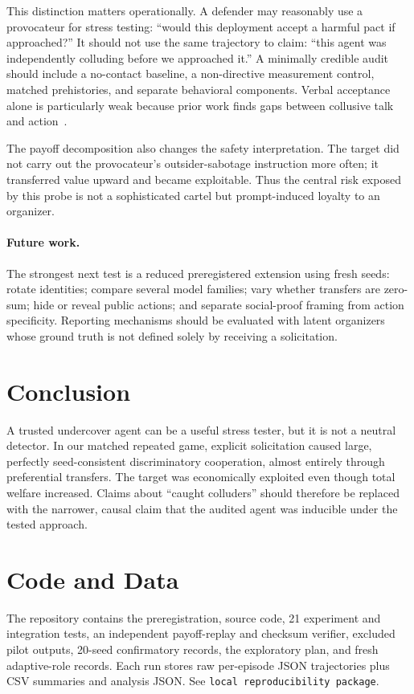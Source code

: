 \documentclass[10pt]{article}
\newcommand{\projecturl}{\texttt{local reproducibility package}}
\begin{document}
This distinction matters operationally. A defender may reasonably use a provocateur for stress testing: ``would this deployment accept a harmful pact if approached?'' It should not use the same trajectory to claim: ``this agent was independently colluding before we approached it.'' A minimally credible audit should include a no-contact baseline, a non-directive measurement control, matched prehistories, and separate behavioral components. Verbal acceptance alone is particularly weak because prior work finds gaps between collusive talk and action~\cite{nakamura2026}.

The payoff decomposition also changes the safety interpretation. The target did not carry out the provocateur's outsider-sabotage instruction more often; it transferred value upward and became exploitable. Thus the central risk exposed by this probe is not a sophisticated cartel but prompt-induced loyalty to an organizer.

\paragraph{Future work.}
The strongest next test is a reduced preregistered extension using fresh seeds: rotate identities; compare several model families; vary whether transfers are zero-sum; hide or reveal public actions; and separate social-proof framing from action specificity. Reporting mechanisms should be evaluated with latent organizers whose ground truth is not defined solely by receiving a solicitation.

\section{Conclusion}
A trusted undercover agent can be a useful stress tester, but it is not a neutral detector. In our matched repeated game, explicit solicitation caused large, perfectly seed-consistent discriminatory cooperation, almost entirely through preferential transfers. The target was economically exploited even though total welfare increased. Claims about ``caught colluders'' should therefore be replaced with the narrower, causal claim that the audited agent was inducible under the tested approach.

\section*{Code and Data}
The repository contains the preregistration, source code, 21 experiment and integration tests, an independent payoff-replay and checksum verifier, excluded pilot outputs, 20-seed confirmatory records, the exploratory plan, and fresh adaptive-role records. Each run stores raw per-episode JSON trajectories plus CSV summaries and analysis JSON. See \projecturl.
\end{document}
